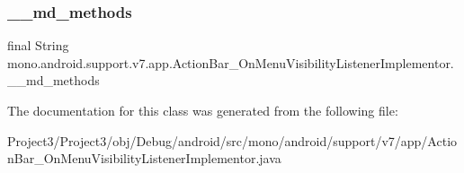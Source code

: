 \subsubsection{\texorpdfstring{\+\_\+\+\_\+md\+\_\+methods}{\_\_md\_methods}}
{\footnotesize\ttfamily final String mono.\+android.\+support.\+v7.\+app.\+Action\+Bar\+\_\+\+On\+Menu\+Visibility\+Listener\+Implementor.\+\_\+\+\_\+md\+\_\+methods\hspace{0.3cm}{\ttfamily [static]}}



The documentation for this class was generated from the following file\+:\begin{DoxyCompactItemize}
\item 
Project3/\+Project3/obj/\+Debug/android/src/mono/android/support/v7/app/Action\+Bar\+\_\+\+On\+Menu\+Visibility\+Listener\+Implementor.\+java\end{DoxyCompactItemize}
